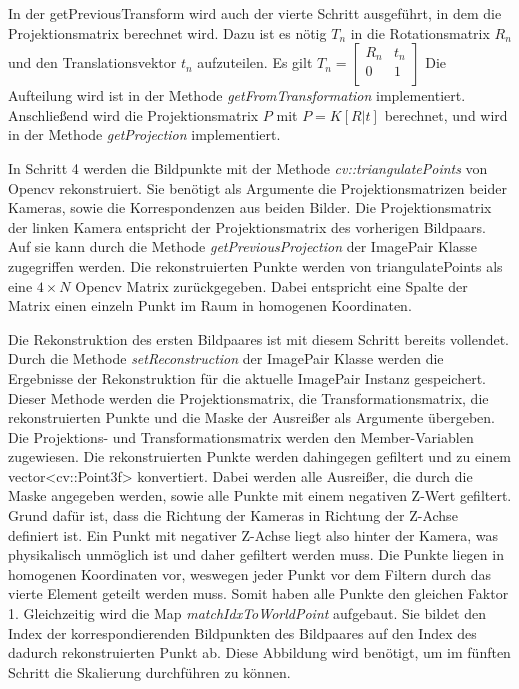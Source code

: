 In der getPreviousTransform wird auch der vierte Schritt ausgeführt, in dem die Projektionsmatrix berechnet wird.  
Dazu ist es nötig $T_n$ in die Rotationsmatrix $R_n$ und den Translationsvektor $t_n$ aufzuteilen. 
Es gilt $T_n = \begin{bmatrix}
                R_n & t_n \\
                0 & 1 \\
            \end{bmatrix}$
Die Aufteilung wird ist in der Methode \emph{getFromTransformation} implementiert.
Anschließend wird die Projektionsmatrix $P$ mit $P = K[R|t]$ berechnet, und wird in der Methode \emph{getProjection} implementiert.

In Schritt 4 werden die Bildpunkte mit der Methode \emph{cv::triangulatePoints} von Opencv rekonstruiert.
Sie benötigt als Argumente die Projektionsmatrizen beider Kameras, sowie die Korrespondenzen aus beiden Bilder.
Die Projektionsmatrix der linken Kamera entspricht der Projektionsmatrix des vorherigen Bildpaars. 
Auf sie kann durch die Methode \emph{getPreviousProjection} der ImagePair Klasse zugegriffen werden.%
Die rekonstruierten Punkte werden von triangulatePoints als eine $4\times N$ Opencv Matrix zurückgegeben.
Dabei entspricht eine Spalte der Matrix einen einzeln Punkt im Raum in homogenen Koordinaten.

Die Rekonstruktion des ersten Bildpaares ist mit diesem Schritt bereits vollendet.
Durch die Methode \emph{setReconstruction} der ImagePair Klasse werden die Ergebnisse der Rekonstruktion für die aktuelle ImagePair Instanz gespeichert.
Dieser Methode werden die Projektionsmatrix, die Transformationsmatrix, die rekonstruierten Punkte und die Maske der Ausreißer als Argumente übergeben. 
Die Projektions- und Transformationsmatrix werden den Member-Variablen zugewiesen.
Die rekonstruierten Punkte werden dahingegen gefiltert und zu einem vector<cv::Point3f> konvertiert.
Dabei werden alle Ausreißer, die durch die Maske angegeben werden, sowie alle Punkte mit einem negativen Z-Wert gefiltert.
Grund dafür ist, dass die Richtung der Kameras in Richtung der Z-Achse definiert ist.
Ein Punkt mit negativer Z-Achse liegt also hinter der Kamera, was physikalisch unmöglich ist und daher gefiltert werden muss.
Die Punkte liegen in homogenen Koordinaten vor, weswegen jeder Punkt vor dem Filtern durch das vierte Element geteilt werden muss.
Somit haben alle Punkte den gleichen Faktor 1.
Gleichzeitig wird die Map \emph{matchIdxToWorldPoint} aufgebaut.
Sie bildet den Index der korrespondierenden Bildpunkten des Bildpaares auf den Index des dadurch rekonstruierten Punkt ab.
Diese Abbildung wird benötigt, um im fünften Schritt die Skalierung durchführen zu können.

